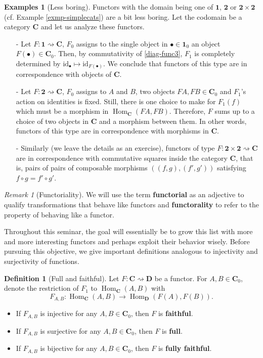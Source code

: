 \documentclass{article}
\theoremstyle{definition}
\newtheorem{defn}[thm]{Definition}
\newtheorem{exmps}[thm]{Examples}
\theoremstyle{remark}
\newtheorem{rem}[thm]{Remark}
\DeclareMathOperator{\Hom}{Hom}
\newcommand{\id}{\text{id}}
\begin{document}
\begin{exmps}[Less boring]\label{exmp-simplediagrams}
    Functors with the domain being one of $\mathbf{1}$, $\mathbf{2}$ or $\mathbf{2}\times \mathbf{2}$ (cf. Example \ref{exmp-simplecats}) are a bit less boring. Let the codomain be a category $\mathbf{C}$ and let us analyze these functors.
    \begin{itemize}
        \item[-] Let $F: \mathbf{1} \rightsquigarrow \mathbf{C}$, $F_0$ assigns to the single object in $\bullet \in \mathbf{1}_0$ an object $F(\bullet) \in \mathbf{C}_0$. Then, by commutativity of \eqref{diag-func3}, $F_1$ is completely determined by $\id_{\bullet} \mapsto \id_{F(\bullet)}$. We conclude that functors of this type are in correspondence with objects of $\mathbf{C}$.
        
        \item[-] Let $F: \mathbf{2} \rightsquigarrow \mathbf{C}$, $F_0$ assigns to $A$ and $B$, two objects $FA, FB \in\mathbf{C}_0$ and $F_1$'s action on identities is fixed. Still, there is one choice to make for $F_1(f)$ which must be a morphism in $\Hom_{\mathbf{C}}(FA, FB)$. Therefore, $F$ sums up to a choice of two objects in $\mathbf{C}$ and a morphism between them. In other words, functors of this type are in correspondence with morphisms in $\mathbf{C}$.
        
        \item[-] Similarly (we leave the details as an exercise), functors of type $F: \mathbf{2}\times \mathbf{2} \rightsquigarrow \mathbf{C}$ are in correspondence with commutative squares inside the category $\mathbf{C}$, that is, pairs of pairs of composable morphisms $((f,g), (f',g'))$ satisfying $f \circ g = f' \circ g'$.
    \end{itemize}
\end{exmps}
\begin{rem}[Functoriality]
	We will use the term \textbf{functorial} as an adjective to qualify transformations that behave like functors and \textbf{functorality} to refer to the property of behaving like a functor.
\end{rem}
Throughout this seminar, the goal will essentially be to grow this list with more and more interesting functors and perhaps exploit their behavior wisely. Before pursuing this objective, we give important definitions analogous to injectivity and surjectivity of functions.
\begin{defn}[Full and faithful]
	Let $F:\mathbf{C} \rightsquigarrow \mathbf{D}$ be a functor. For $A,B \in \mathbf{C}_0$, denote the restriction of $F_1$ to $\Hom_{\mathbf{C}}(A,B)$ with \[F_{A,B}:\Hom_{\mathbf{C}}(A,B) \rightarrow \Hom_{\mathbf{D}}(F(A), F(B)).\]
	\begin{itemize}
		\item If $F_{A,B}$ is injective for any $A,B \in \mathbf{C}_0$, then $F$ is \textbf{faithful}.
		\item If $F_{A,B}$ is surjective for any $A,B \in \mathbf{C}_0$, then $F$ is \textbf{full}.
		\item If $F_{A,B}$ is bijective for any $A,B \in \mathbf{C}_0$, then $F$ is \textbf{fully faithful}.
	\end{itemize}    
\end{defn}
\end{document}
